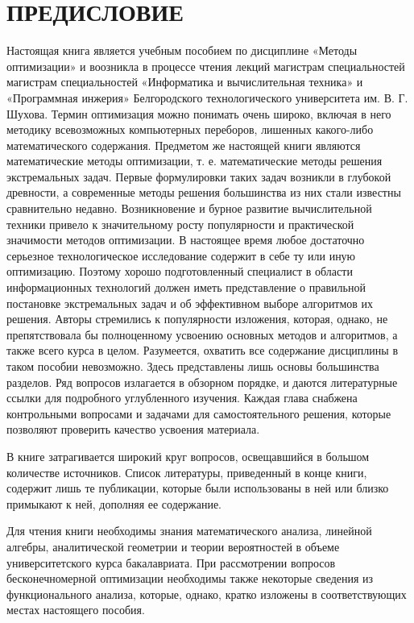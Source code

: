\section{ПРЕДИСЛОВИЕ}
	Настоящая книга является учебным пособием по дисциплине «Методы оптимизации» и воозникла в процессе чтения лекций магистрам специальностей магистрам специальностей «Информатика и вычислительная техника» и «Программная инжерия» Белгородского технологического университета им. В. Г. Шухова. Термин оптимизация можно понимать очень широко, включая в него методику всевозможных компьютерных переборов, лишенных какого-либо математического содержания. Предметом же настоящей книги являются математические методы оптимизации, т. е. математические методы решения экстремальных задач. Первые формулировки таких задач возникли в глубокой древности, а современные методы решения большинства из них стали известны сравнительно недавно. Возникновение и бурное развитие вычислительной техники привело к значительному росту популярности и практической значимости методов оптимизации. В настоящее время любое достаточно серьезное технологическое исследование содержит в себе ту или иную оптимизацию. Поэтому хорошо подготовленный специалист в области информационных технологий должен иметь представление о правильной постановке экстремальных задач и об эффективном выборе алгоритмов их решения. Авторы стремились к популярности изложения, которая, однако, не препятствовала бы полноценному усвоению основных методов и алгоритмов, а также всего курса в целом. Разумеется, охватить все содержание дисциплины в таком пособии невозможно. Здесь представлены лишь основы большинства разделов. Ряд вопросов излагается в обзорном порядке, и даются литературные ссылки для подробного углубленного изучения. Каждая глава снабжена контрольными вопросами и задачами для самостоятельного решения, которые позволяют проверить качество усвоения материала.

	В книге затрагивается широкий круг вопросов, освещавшийся в большом количестве источников. Список литературы, приведенный в конце книги, содержит лишь те публикации, которые были использованы в ней или близко примыкают к ней, дополняя ее содержание.

	Для чтения книги необходимы знания математического анализа, линейной алгебры, аналитической геометрии и теории вероятностей в объеме университетского курса бакалавриата. При рассмотрении вопросов бесконечномерной оптимизации необходимы также некоторые сведения из функционального анализа, которые, однако, кратко изложены в соответствующих местах настоящего пособия.

